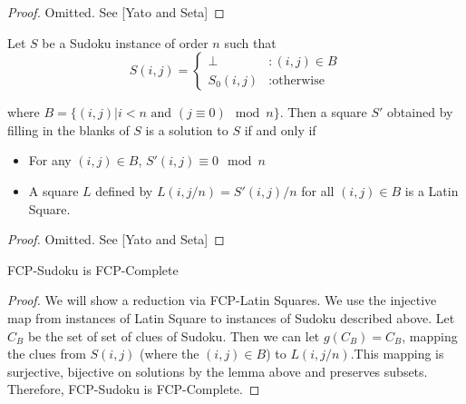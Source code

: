 \documentclass[runningheads,a4paper]{llncs}
\begin{document}
\begin{proof} 
Omitted. See [Yato and Seta] 
\end{proof}

\begin{lemma}
Let $S$ be a Sudoku instance of order $n$ such that
\begin{displaymath}
S(i,j) = \left\{
\begin{array}{lr}
\perp & : (i,j) \in B\\
S_0 (i,j) & : \text{otherwise}
\end{array}
\right.
\end{displaymath}

where $B = \{ (i,j) | i < n \text{ and } (j \equiv 0) \mod n \}$. Then a square $S'$ obtained by filling in the blanks of $S$ is a solution to $S$ if and only if

\begin{itemize}
\item For any $(i,j) \in B$, $S'(i,j) \equiv 0 \mod n$
\item A square $L$ defined by $L(i, j/n) = S'(i,j)/n$ for all $(i, j) \in B$ is a Latin Square.
\end{itemize}

\end{lemma}

\begin{proof} 
Omitted. See [Yato and Seta] 
\end{proof}

\begin{lemma} 
FCP-Sudoku is FCP-Complete
\end{lemma}

\begin{proof} 
We will show a reduction via FCP-Latin Squares. We use the injective map from instances of Latin Square to instances of Sudoku described above. Let $C_B$ be the set of set of clues of Sudoku. Then we can let $g(C_B)=C_B$, mapping the clues from $S(i,j)$ (where the $(i,j) \in B$) to $L(i, j/n)$.This mapping is surjective, bijective on solutions by the lemma above and preserves subsets. Therefore, FCP-Sudoku is FCP-Complete. 
\end{proof}
\end{document}
